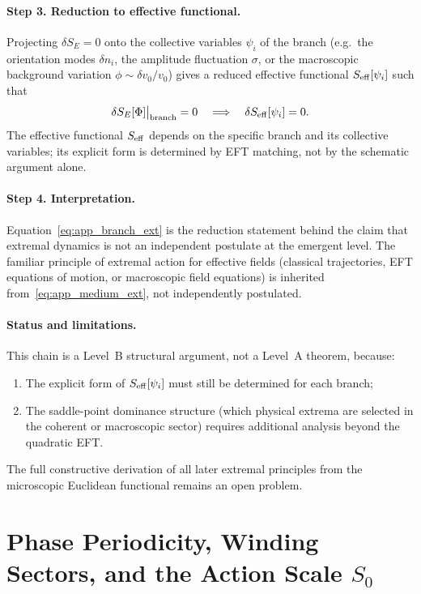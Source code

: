 \documentclass[11pt,a4paper]{article}
\numberwithin{equation}{section}
\begin{document}
\paragraph{Step 3. Reduction to effective functional.}
Projecting $\delta S_E = 0$ onto the collective variables $\psi_i$
of the branch (e.g.\ the orientation modes $\delta n_i$, the amplitude
fluctuation $\sigma$, or the macroscopic background variation
$\phi \sim \delta v_0/v_0$) gives a reduced effective functional
$S_{\rm eff}[\psi_i]$ such that
\begin{equation}
  \delta S_E[\Phi]\big|_{\rm branch} = 0
  \quad\Longrightarrow\quad
  \delta S_{\rm eff}[\psi_i] = 0.
  \label{eq:app_branch_ext}
\end{equation}
The effective functional $S_{\rm eff}$ depends on the specific branch
and its collective variables; its explicit form is determined by EFT
matching, not by the schematic argument alone.

\paragraph{Step 4. Interpretation.}
Equation~\eqref{eq:app_branch_ext} is the reduction statement behind
the claim that extremal dynamics is not an independent postulate at
the emergent level.
The familiar principle of extremal action for effective fields
(classical trajectories, EFT equations of motion, or macroscopic
field equations) is inherited from~\eqref{eq:app_medium_ext}, not
independently postulated.

\paragraph{Status and limitations.}
This chain is a Level~B structural argument, not a Level~A theorem,
because:
\begin{enumerate}
  \item The explicit form of $S_{\rm eff}[\psi_i]$ must still be
    determined for each branch;
  \item The saddle-point dominance structure (which physical extrema
    are selected in the coherent or macroscopic sector) requires
    additional analysis beyond the quadratic EFT.
\end{enumerate}
The full constructive derivation of all later extremal principles
from the microscopic Euclidean functional remains an open problem.

\section{Phase Periodicity, Winding Sectors, and the Action Scale $S_0$}
\label{app:action_scale_S0}
\end{document}
